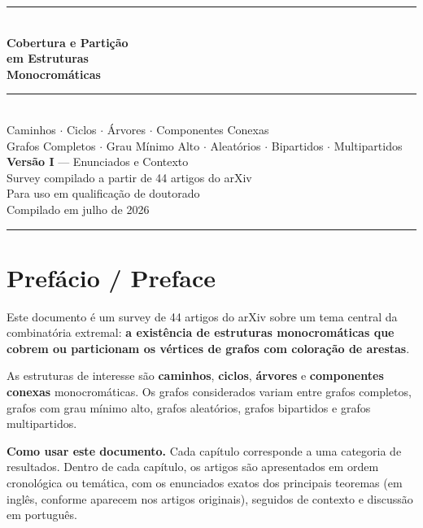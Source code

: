 \documentclass[12pt,a4paper,twoside,openright]{book}
\theoremstyle{definition}
\begin{document}
\begin{titlepage}
\centering
\vspace*{2cm}
{\color{darkblue}\rule{\linewidth}{2pt}}\\[0.5cm]
{\Huge\bfseries\color{darkblue}
  Cobertura e Partição\\[4pt]
  em Estruturas\\[4pt]
  Monocromáticas}\\[0.8cm]
{\color{accent}\rule{\linewidth}{1pt}}\\[0.6cm]
{\large
  Caminhos $\cdot$ Ciclos $\cdot$ Árvores $\cdot$ Componentes Conexas}\\[0.3cm]
{\normalsize
  Grafos Completos $\cdot$ Grau Mínimo Alto $\cdot$ Aleatórios $\cdot$ Bipartidos $\cdot$ Multipartidos}\\[2cm]
{\large\textbf{Versão I} — Enunciados e Contexto}\\[0.4cm]
{\normalsize Survey compilado a partir de 44 artigos do arXiv}\\[0.3cm]
{\normalsize Para uso em qualificação de doutorado}\\[2.5cm]
{\normalsize Compilado em julho de 2026}
\vfill
{\color{darkblue}\rule{\linewidth}{2pt}}
\end{titlepage}

\frontmatter
\tableofcontents
\cleardoublepage

\chapter*{Prefácio / Preface}


Este documento é um survey de 44 artigos do arXiv sobre um tema central da combinatória extremal:
\textbf{a existência de estruturas monocromáticas que cobrem ou particionam os vértices de grafos com coloração de arestas}.

As estruturas de interesse são \textbf{caminhos}, \textbf{ciclos}, \textbf{árvores} e \textbf{componentes conexas} monocromáticas.
Os grafos considerados variam entre grafos completos, grafos com grau mínimo alto, grafos aleatórios,
grafos bipartidos e grafos multipartidos.

\medskip
\noindent\textbf{Como usar este documento.}
Cada capítulo corresponde a uma categoria de resultados. Dentro de cada capítulo, os artigos são
apresentados em ordem cronológica ou temática, com os enunciados exatos dos principais teoremas
(em inglês, conforme aparecem nos artigos originais), seguidos de contexto e discussão em português.
\end{document}
